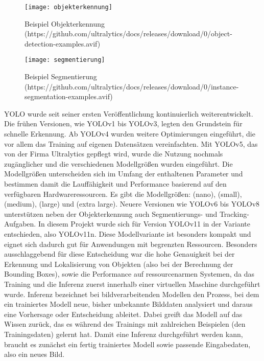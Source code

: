 \begin{figure}[H]
    \centering
    \texttt{[image: objekterkennung]}
    \caption[Beispiel Objekterkennung]{Beispiel Objekterkennung (https://github.com/ultralytics/docs/releases/download/0/object-detection-examples.avif)}\label{beispiel_objekterkennung}
\end{figure}

\begin{figure}[H]
    \centering
    \texttt{[image: segmentierung]}
    \caption[Beispiel Segmentierung]{Beispiel Segmentierung (https://github.com/ultralytics/docs/releases/download/0/instance-segmentation-examples.avif)}\label{beispiel_segmentierung}
\end{figure}

YOLO wurde seit seiner ersten Veröffentlichung kontinuierlich weiterentwickelt. 
Die frühen Versionen, wie YOLOv1 bis YOLOv3, legten den Grundstein für schnelle Erkennung. 
Ab YOLOv4 wurden weitere Optimierungen eingeführt, die vor allem das Training auf eigenen Datensätzen vereinfachten. 
Mit YOLOv5, das von der Firma Ultralytics gepflegt wird, wurde die Nutzung nochmals zugänglicher und die verschiedenen Modellgrößen wurden eingeführt.
Die Modellgrößen unterscheiden sich im Umfang der enthaltenen Parameter und bestimmen damit die Lauffähigkeit und Performance basierend auf den verfügbaren Hardwareressourcen.
Es gibt die Modellgrößen:  (nano),  (small),  (medium),  (large) und  (extra large).
Neuere Versionen wie YOLOv6 bis YOLOv8 unterstützen neben der Objekterkennung auch Segmentierungs- und Tracking-Aufgaben.
\newPar
In diesem Projekt wurde sich für Version YOLOv11 in der Variante  entschieden, also YOLOv11n.
Diese Modellvariante ist besonders kompakt und eignet sich dadurch gut für Anwendungen mit begrenzten Ressourcen.
Besonders ausschlaggebend für diese Entscheidung war die hohe Genauigkeit bei der Erkennung und Lokalisierung von Objekten (also bei der Berechnung der Bounding Boxes),
sowie die Performance auf ressourcenarmen Systemen, da das Training und die Inferenz zuerst innerhalb einer virtuellen Maschine durchgeführt wurde.
\newPar
Inferenz bezeichnet bei bildverarbeitenden Modellen den Prozess, bei dem ein trainiertes Modell neue, bisher unbekannte Bilddaten analysiert und daraus eine 
Vorhersage oder Entscheidung ableitet. Dabei greift das Modell auf das Wissen zurück, das es während des Trainings mit zahlreichen Beispielen (den Trainingsdaten) gelernt hat. 
Damit eine Inferenz durchgeführt werden kann, braucht es zunächst ein fertig trainiertes Modell sowie passende Eingabedaten, also ein neues Bild.
